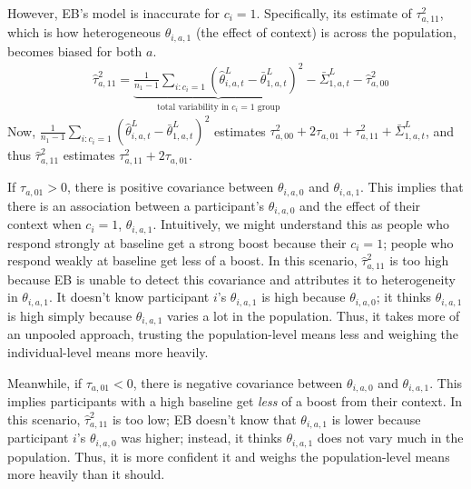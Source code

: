\documentclass[letterpaper, 9pt]{extarticle}
\begin{document}
However, EB's model is inaccurate for $c_i=1$. Specifically, its estimate of $\tau^2_{a,11}$, which is how heterogeneous $\theta_{i,a,1}$ (the effect of context) is across the population, becomes biased for both $a$.
\begin{align*}
    &\hat{\tau}_{a,11}^2 = \underbrace{\frac{1}{n_1 - 1}\sum_{i: c_i = 1}\left(\hat{\theta}^L_{i,a,t} - \bar{\theta}^L_{1,a,t}\right)^2}_{\text{total variability in } c_i = 1 \text{ group}} - \bar{\Sigma}^L_{1,a,t} - \hat{\tau}_{a,00}^2
\end{align*} 
Now, $\frac{1}{n_1 - 1}\sum_{i: c_i = 1}\left(\hat{\theta}^L_{i,a,t} - \bar{\theta}^L_{1,a,t}\right)^2$ estimates $\tau_{a,00}^2 + 2\tau_{a,01} + \tau_{a,11}^2 + \bar{\Sigma}^L_{1,a,t}$, and thus $\hat{\tau}_{a,11}^2$ estimates $\tau_{a,11}^2 + 2\tau_{a,01}$. 

If $\tau_{a,01}>0$, there is positive covariance between $\theta_{i,a,0}$ and $\theta_{i,a,1}$. This implies that there is an association between a participant's $\theta_{i,a,0}$ and the effect of their context when $c_i=1$, $\theta_{i,a,1}$. Intuitively, we might understand this as people who respond strongly at baseline get a strong boost because their $c_i=1$; people who respond weakly at baseline get less of a boost. In this scenario, $\hat{\tau}^2_{a,11}$ is too high because EB is unable to detect this covariance and attributes it to heterogeneity in $\theta_{i,a,1}$. It doesn't know participant $i$'s $\theta_{i,a,1}$ is high because $\theta_{i,a,0}$; it thinks $\theta_{i,a,1}$ is high simply because $\theta_{i,a,1}$ varies a lot in the population. Thus, it takes more of an unpooled approach, trusting the population-level means less and weighing the individual-level means more heavily.

Meanwhile, if $\tau_{a,01}<0$, there is negative covariance between $\theta_{i,a,0}$ and $\theta_{i,a,1}$. This implies participants with a high baseline get \textit{less} of a boost from their context.  In this scenario, $\hat{\tau}^2_{a,11}$ is too low; EB doesn't know that $\theta_{i,a,1}$ is lower because participant $i$'s $\theta_{i,a,0}$ was higher; instead, it thinks $\theta_{i,a,1}$ does not vary much in the population. Thus, it is more confident it and weighs the population-level means more heavily than it should. 
\end{document}
